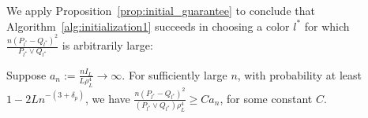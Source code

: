 \documentclass{article}
\begin{document}

We apply Proposition~\ref{prop:initial_guarantee} to conclude that Algorithm~\ref{alg:initialization1} succeeds in choosing a color $l^*$ for which $\frac{n( P_{l^*} -  Q_{l^*})^2}{P_{l^*} \vee Q_{l^*}}$ is arbitrarily large:

\begin{proposition}
\label{prop:initialization_correctness}
Suppose $a_n := \frac{ n I_L}{L \rho^4_L} \rightarrow \infty$. For sufficiently large $n$, with probability at least $1 - 2L n^{-(3+\delta_p)}$, we have $\frac{n (P_{l^*}-Q_{l^*})^2}{(P_{l^*} \vee Q_{l^*}) \rho^4_L} \ge C a_n$, for some constant $C$. 
\end{proposition}
\end{document}
